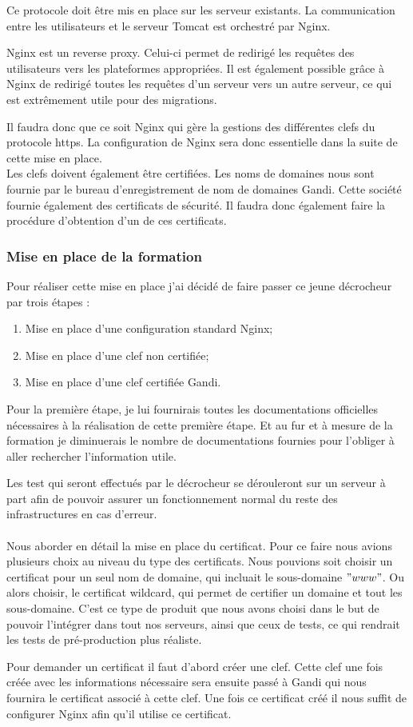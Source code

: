 Ce protocole doit être mis en place sur les serveur existants. La communication entre les utilisateurs et le serveur Tomcat est orchestré par Nginx.

Nginx est un reverse proxy. Celui-ci permet de redirigé les requêtes des utilisateurs vers les plateformes appropriées. Il est également possible grâce à Nginx de redirigé toutes les requêtes d'un serveur vers un autre serveur, ce qui est extrêmement utile pour des migrations.

Il faudra donc que ce soit Nginx qui gère la gestions des différentes clefs du protocole https. La configuration de Nginx sera donc essentielle dans la suite de cette mise en place.\\

Les clefs doivent également être certifiées. Les noms de domaines nous sont fournie par le bureau d'enregistrement de nom de domaines Gandi. Cette société fournie également des certificats de sécurité. Il faudra donc également faire la procédure d'obtention d'un de ces certificats.

\subsubsection{Mise en place de la formation}

Pour réaliser cette mise en place j'ai décidé de faire passer ce jeune décrocheur par trois étapes :

\begin{enumerate}
	\item Mise en place d'une configuration standard Nginx;
	\item Mise en place d'une clef non certifiée;
	\item Mise en place d'une clef certifiée Gandi.
\end{enumerate}

Pour la première étape, je lui fournirais toutes les documentations officielles nécessaires à la réalisation de cette première étape. Et au fur et à mesure de la formation je diminuerais le nombre de documentations fournies pour l'obliger à aller rechercher l'information utile.

Les test qui seront effectués par le décrocheur se dérouleront sur un serveur à part afin de pouvoir assurer un fonctionnement normal du reste des infrastructures en cas d'erreur.\\\\

Nous aborder en détail la mise en place du certificat. Pour ce faire nous avions plusieurs choix au niveau du type des certificats. Nous pouvions soit choisir un certificat pour un seul nom de domaine, qui incluait le sous-domaine $"www"$. Ou alors choisir, le certificat wildcard, qui permet de certifier un domaine et tout les sous-domaine. C'est ce type de produit que nous avons choisi dans le but de pouvoir l'intégrer dans tout nos serveurs, ainsi que ceux de tests, ce qui rendrait les tests de pré-production plus réaliste.

Pour demander un certificat il faut d'abord créer une clef. Cette clef une fois créée avec les informations nécessaire sera ensuite passé à Gandi qui nous fournira le certificat associé à cette clef. Une fois ce certificat créé il nous suffit de configurer Nginx afin qu'il utilise ce certificat.
